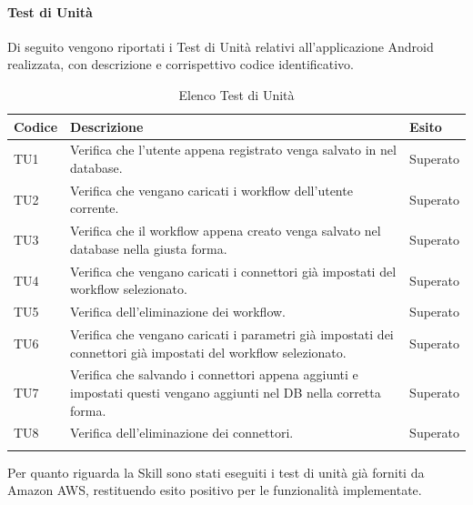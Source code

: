 \paragraph{Test di Unità}
\label{sec:tuRA}
Di seguito vengono riportati i Test di Unità relativi all'applicazione Android realizzata, con descrizione e corrispettivo codice identificativo.
\begin{center}
	\centering
	\renewcommand{\arraystretch}{1.5}
	\begin{longtable}{  p{1.5cm}  p{10.5cm} p{2cm}  }
		\rowcolor{tableHeadYellow}
		\textbf{Codice}   & \textbf{Descrizione} & \textbf{Esito} \\ 
		\endhead
		TU1 & Verifica che l’utente appena registrato venga salvato in nel database.  & Superato \\
		TU2 & Verifica che vengano caricati i workflow dell’utente corrente. & Superato \\
		TU3 & Verifica che il workflow appena creato venga salvato nel database nella giusta forma. & Superato \\
		TU4 & Verifica che vengano caricati i connettori già impostati del workflow selezionato. & Superato \\
		TU5 & Verifica dell’eliminazione dei workflow. & Superato \\
		TU6 & Verifica che vengano caricati i parametri già impostati dei connettori già impostati del workflow selezionato. & Superato \\
		TU7 & Verifica che salvando i connettori appena aggiunti e impostati questi vengano aggiunti nel DB nella corretta forma. & Superato \\
		TU8 & Verifica dell’eliminazione dei connettori. & Superato \\
		\rowcolor{white}
		\caption{Elenco Test di Unità}
	\end{longtable}
\end{center}
Per quanto riguarda la Skill sono stati eseguiti i test di unità già forniti da Amazon AWS, restituendo esito positivo per le funzionalità implementate.
